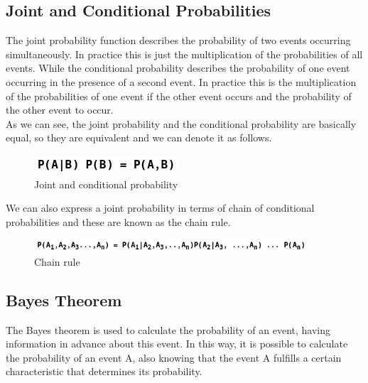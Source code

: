 \documentclass[sigconf,12pt,review=false,natbib=false]{acmart}
\begin{document}
\subsection{Joint and Conditional Probabilities}

The joint probability function describes the probability of two events occurring simultaneously. In
practice this is just the multiplication of the probabilities of all events. While the conditional
probability describes the probability of one event occurring in the presence of a second event. In
practice this is the multiplication of the probabilities of one event if the other event occurs and
the probability of the other event to occur. \\

As we can see, the joint probability and the conditional probability are basically equal, so they are
equivalent and we can denote it as follows.

\begin{figure}[h!]
    \centering
    \includegraphics[]{jcp_relationship}
    \caption{Joint and conditional probability}
    \label{fig:jcp_relationship}
\end{figure}

We can also express a joint probability in terms of chain of conditional probabilities and these are
known as the chain rule. \\

\begin{figure}[h!]
    \centering
    \includegraphics[width=4in]{chain_rule}
    \caption{Chain rule}
    \label{fig:jcp_relationship}
\end{figure}

\subsection{Bayes Theorem}

The Bayes theorem is used to calculate the probability of an event, having information in advance
about this event. In this way, it is possible to calculate the probability of an event A, also
knowing that the event A fulfills a certain characteristic that determines its probability. \\
\end{document}
